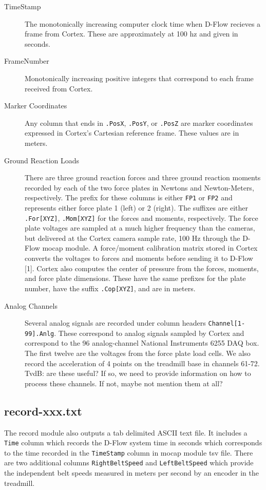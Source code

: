 \documentclass[10pt,a4paper,twocolumn]{article}
\begin{document}
\begin{description}
  \item[TimeStamp] The monotonically increasing computer clock time when D-Flow
    recieves a frame from Cortex. These are approximately at 100 hz and given
    in seconds.
  \item[FrameNumber] Monotonically increasing positive integers that correspond
    to each frame received from Cortex.
  \item[Marker Coordinates] Any column that ends in \verb+.PosX+, \verb+.PosY+,
    or \verb+.PosZ+ are marker coordinates expressed in Cortex's Cartesian
    reference frame. These values are in meters.
  \item[Ground Reaction Loads] There are three ground reaction forces and three
    ground reaction moments recorded by each of the two force plates in Newtons
    and Newton-Meters, respectively. The prefix for these columns is either
    \verb+FP1+ or \verb+FP2+ and represents either force plate 1 (left) or 2
    (right). The suffixes are either \verb+.For[XYZ]+, \verb+.Mom[XYZ]+ for the
    forces and moments, respectively. The force plate voltages are sampled at a
    much higher frequency than the cameras, but delivered at the Cortex camera
    sample rate, 100 Hz through the D-Flow mocap module. A force/moment
    calibration matrix stored in Cortex converts the voltages to forces and
    moments before sending it to D-Flow [1]. Cortex also computes the center of
    pressure from the forces, moments, and force plate dimensions. These have
    the same prefixes for the plate number, have the suffix \verb+.Cop[XYZ]+,
    and are in meters.
  \item[Analog Channels] Several analog signals are recorded under column
    headers \verb+Channel[1-99].Anlg+. These correspond to analog signals
    sampled by Cortex and correspond to the 96 analog-channel National 
    Instruments 6255 DAQ box. The first twelve are the voltages from the 
    force plate load cells. We also record the acceleration of 4 points on the
    treadmill base in channels 61-72.  TvdB: are these useful?  If so, we need to 
    provide information on how to process these channels.  If not, maybe
    not mention them at all?
\end{description}

\subsection*{record-xxx.txt}
%
The record module also outputs a tab delimited ASCII text file. It includes a
\verb+Time+ column which records the D-Flow system time in seconds which
corresponds to the time recorded in the \verb+TimeStamp+ column in mocap module
tsv file. There are two additional columns \verb+RightBeltSpeed+ and
\verb+LeftBeltSpeed+ which provide the independent belt speeds measured in
meters per second by an encoder in the treadmill.
\end{document}
